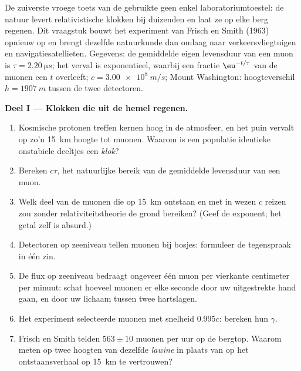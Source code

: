 \begin{problem}\label{pb:b3:relativistic-kinematics:1}
De zuiverste vroege toets van de  gebruikte geen enkel
laboratoriumtoestel: de natuur levert relativistische klokken bij duizenden
en laat ze op elke berg regenen. Dit vraagstuk bouwt het experiment van
Frisch en Smith (1963) opnieuw op en brengt dezelfde natuurkunde dan omlaag
naar verkeersvliegtuigen en navigatiesatellieten. Gegevens: de gemiddelde
eigen levensduur van een muon is $\tau =
\qty{2.20}{\micro s}$; het verval
is exponentieel, waarbij een fractie $\eu^{-t/\tau}$ van de muonen een
 $t$ overleeft; $c =
\qty{3.00e8}{m/s}$; Mount Washington:
hoogteverschil $h =
\qty{1907}{m}$ tussen de twee detectoren.

\medskip\noindent\textbf{Deel I --- Klokken die uit de hemel regenen.}
\begin{enumerate}
  \item Kosmische protonen treffen kernen hoog in de atmosfeer, en het
        puin vervalt op zo'n \qty{15}{km} hoogte tot muonen. Waarom is
        een populatie identieke onstabiele deeltjes een \emph{klok}?
  \item Bereken $c\tau$, het natuurlijke bereik van de gemiddelde
        levensduur van een muon.
  \item Welk deel van de muonen die op \qty{15}{km} ontstaan en met in
        wezen $c$ reizen zou zonder relativiteitstheorie de grond
        bereiken? (Geef de exponent; het getal zelf is absurd.)
  \item Detectoren op zeeniveau tellen muonen bij bosjes: formuleer de
        tegenspraak in één zin.
  \item De flux op zeeniveau bedraagt ongeveer één muon per vierkante
        centimeter per minuut: schat hoeveel muonen er elke seconde door
        uw uitgestrekte hand gaan, en door uw lichaam tussen twee
        hartslagen.
  \item Het experiment selecteerde muonen met snelheid $0.995c$: bereken
        hun $\gamma$.
  \item Frisch en Smith telden $563 \pm 10$ muonen per uur op de
        bergtop. Waarom meten op twee hoogten van dezelfde
        \emph{lawine} in plaats van op het ontstaansverhaal op
        \qty{15}{km} te vertrouwen?
\end{enumerate}


\end{problem}
